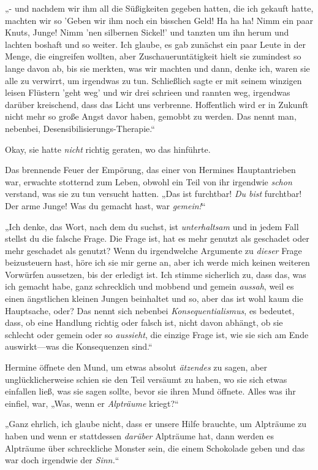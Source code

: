{„- und nachdem wir ihm all die Süßigkeiten gegeben hatten, die ich gekauft hatte, machten wir so 'Geben wir ihm noch ein bisschen Geld! Ha ha ha! Nimm ein paar Knuts, Junge! Nimm 'nen silbernen Sickel!' und tanzten um ihn herum und lachten boshaft und so weiter. Ich glaube, es gab zunächst ein paar Leute in der Menge, die eingreifen wollten, aber Zuschaueruntätigkeit hielt sie zumindest so lange davon ab, bis sie merkten, was wir machten und dann, denke ich, waren sie alle zu verwirrt, um irgendwas zu tun. Schließlich sagte er mit seinem winzigen leisen Flüstern 'geht weg' und wir drei schrieen und rannten weg, irgendwas darüber kreischend, dass das Licht uns verbrenne. Hoffentlich wird er in Zukunft nicht mehr so große Angst davor haben, gemobbt zu werden. Das nennt man, nebenbei, Desensibilisierungs-Therapie.“

Okay, sie hatte \emph{nicht} richtig geraten, wo das hinführte.

Das brennende Feuer der Empörung, das einer von Hermines Hauptantrieben war, erwachte stotternd zum Leben, obwohl ein Teil von ihr irgendwie \emph{schon} verstand, was sie zu tun versucht hatten. „Das ist furchtbar! \emph{Du bist} furchtbar! Der arme Junge! Was du gemacht hast, war \emph{gemein!}“

„Ich denke, das Wort, nach dem du suchst, ist \emph{unterhaltsam} und in jedem Fall stellst du die falsche Frage. Die Frage ist, hat es mehr genutzt als geschadet oder mehr geschadet als genutzt? Wenn du irgendwelche Argumente zu \emph{dieser} Frage beizusteuern hast, höre ich sie mir gerne an, aber ich werde mich keinen weiteren Vorwürfen aussetzen, bis der erledigt ist. Ich stimme sicherlich zu, dass das, was ich gemacht habe, ganz schrecklich und mobbend und gemein \emph{aussah}, weil es einen ängstlichen kleinen Jungen beinhaltet und so, aber das ist wohl kaum die Hauptsache, oder? Das nennt sich nebenbei \emph{Konsequentialismus}, es bedeutet, dass, ob eine Handlung richtig oder falsch ist, nicht davon abhängt, ob sie schlecht oder gemein oder so \emph{aussieht}, die einzige Frage ist, wie sie sich am Ende auswirkt—was die Konsequenzen sind.“

Hermine öffnete den Mund, um etwas absolut \emph{ätzendes} zu sagen, aber unglücklicherweise schien sie den Teil versäumt zu haben, wo sie sich etwas einfallen ließ, was sie sagen sollte, bevor sie ihren Mund öffnete. Alles was ihr einfiel, war, „Was, wenn er \emph{Alpträume} kriegt?“

„Ganz ehrlich, ich glaube nicht, dass er unsere Hilfe brauchte, um Alpträume zu haben und wenn er stattdessen \emph{darüber} Alpträume hat, dann werden es Alpträume über schreckliche Monster sein, die einem Schokolade geben und das war doch irgendwie der \emph{Sinn.}“

}
